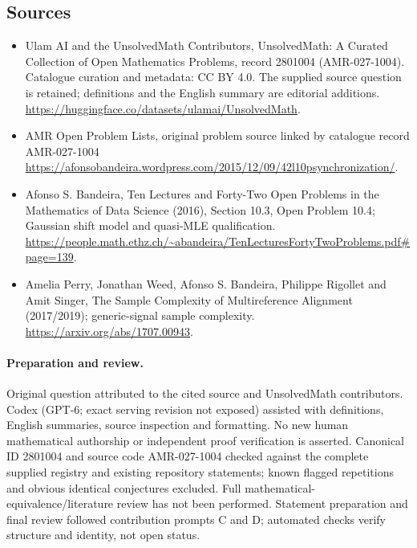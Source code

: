 \documentclass[11pt]{article}
\begin{document}
\subsection{Sources}
\begin{itemize}
\item[\hypertarget{source:2801004:1}{S1}] Ulam AI and the UnsolvedMath Contributors, UnsolvedMath: A Curated Collection of Open Mathematics Problems, record 2801004 (AMR-027-1004). Catalogue curation and metadata: CC BY 4.0. The supplied source question is retained; definitions and the English summary are editorial additions.
\url{https://huggingface.co/datasets/ulamai/UnsolvedMath}.
\item[\hypertarget{source:2801004:2}{S2}] AMR Open Problem Lists, original problem source linked by catalogue record AMR-027-1004
\url{https://afonsobandeira.wordpress.com/2015/12/09/42l10psynchronization/}.
\item[\hypertarget{source:2801004:3}{S3}] Afonso S. Bandeira, Ten Lectures and Forty-Two Open Problems in the Mathematics of Data Science (2016), Section 10.3, Open Problem 10.4; Gaussian shift model and quasi-MLE qualification.
\url{https://people.math.ethz.ch/~abandeira/TenLecturesFortyTwoProblems.pdf#page=139}.
\item[\hypertarget{source:2801004:4}{S4}] Amelia Perry, Jonathan Weed, Afonso S. Bandeira, Philippe Rigollet and Amit Singer, The Sample Complexity of Multireference Alignment (2017/2019); generic-signal sample complexity.
\url{https://arxiv.org/abs/1707.00943}.
\end{itemize}
\paragraph{Preparation and review.}
Original question attributed to the cited source and UnsolvedMath contributors. Codex (GPT-6; exact serving revision not exposed) assisted with definitions, English summaries, source inspection and formatting. No new human mathematical authorship or independent proof verification is asserted. Canonical ID 2801004 and source code AMR-027-1004 checked against the complete supplied registry and existing repository statements; known flagged repetitions and obvious identical conjectures excluded. Full mathematical-equivalence/literature review has not been performed. Statement preparation and final review followed contribution prompts C and D; automated checks verify structure and identity, not open status.
\label{end:2801004}
\end{document}
